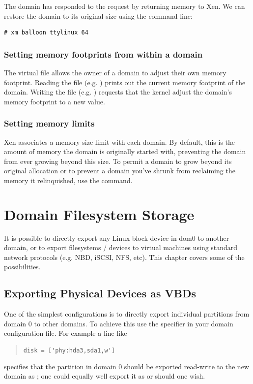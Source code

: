 \documentclass[11pt,twoside,final,openright]{report}
\begin{document}
The domain has responded to the request by returning memory to Xen. We
can restore the domain to its original size using the command line:

\begin{verbatim}
# xm balloon ttylinux 64
\end{verbatim}

\subsection{Setting memory footprints from within a domain}

The virtual file  allows the owner of a
domain to adjust their own memory footprint.  Reading the file
(e.g. ) prints out the current
memory footprint of the domain.  Writing the file
(e.g. ) requests
that the kernel adjust the domain's memory footprint to a new value.

\subsection{Setting memory limits}

Xen associates a memory size limit with each domain.  By default, this
is the amount of memory the domain is originally started with,
preventing the domain from ever growing beyond this size.  To permit a
domain to grow beyond its original allocation or to prevent a domain
you've shrunk from reclaiming the memory it relinquished, use the 
 command.

\chapter{Domain Filesystem Storage}

It is possible to directly export any Linux block device in dom0 to
another domain, or to export filesystems / devices to virtual machines
using standard network protocols (e.g. NBD, iSCSI, NFS, etc).  This
chapter covers some of the possibilities.


\section{Exporting Physical Devices as VBDs} 
\label{s:exporting-physical-devices-as-vbds}

One of the simplest configurations is to directly export 
individual partitions from domain 0 to other domains. To 
achieve this use the  specifier in your domain 
configuration file. For example a line like
\begin{quote}
\verb_disk = ['phy:hda3,sda1,w']_
\end{quote}
specifies that the partition  in domain 0 
should be exported read-write to the new domain as ; 
one could equally well export it as  or 
 should one wish. 
\end{document}

